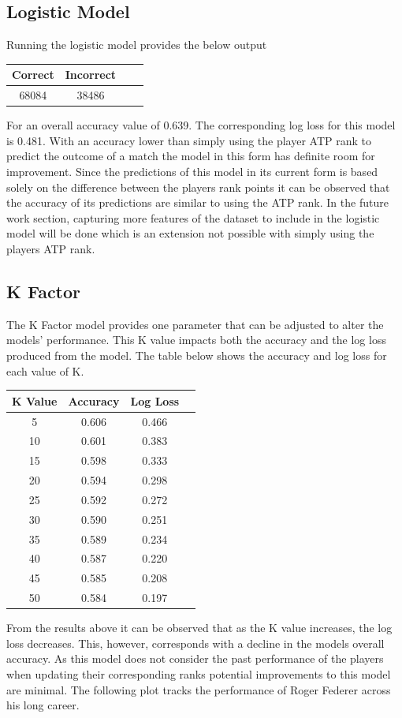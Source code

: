 \documentclass[12pt,a4paper]{article}
\begin{document}
\subsection{Logistic Model}
Running the logistic model provides the below output
\begin{center}
  \begin{tabular}{||c c c c||}
    \hline
    Correct & Incorrect \\
    \hline\hline
    68084   & 38486     \\
    \hline
  \end{tabular}
\end{center}
For an overall accuracy value of 0.639. The corresponding log loss for this model is 0.481.
With an accuracy lower than simply using the player ATP rank to predict the outcome of a
match the model in this form has definite room for improvement. Since the predictions of
this model in its current form is based solely on the difference between the players rank
points it can be observed that the accuracy of its predictions are similar to using the ATP
rank. In the future work section, capturing more features of the dataset to include in the
logistic model will be done which is an extension not possible with simply using the players
ATP rank.
\subsection{K Factor}
The K Factor model provides one parameter that can be adjusted to alter the models' performance.
This K value impacts both the accuracy and the log loss produced from the model. The table
below shows the accuracy and log loss for each value of K.

\begin{center}
  \begin{tabular}{||c c c c||}
    \hline
    K Value & Accuracy & Log Loss \\
    \hline\hline
    5       & 0.606    & 0.466    \\
    10      & 0.601    & 0.383    \\
    15      & 0.598    & 0.333    \\
    20      & 0.594    & 0.298    \\
    25      & 0.592    & 0.272    \\
    30      & 0.590    & 0.251    \\
    35      & 0.589    & 0.234    \\
    40      & 0.587    & 0.220    \\
    45      & 0.585    & 0.208    \\
    50      & 0.584    & 0.197    \\
    \hline
  \end{tabular}
\end{center}
From the results above it can be observed that as the K value increases, the log loss decreases.
This, however, corresponds with a decline in the models overall accuracy. As this model
does not consider the past performance of the players when updating their corresponding
ranks potential improvements to this model are minimal. The following plot tracks the performance
of Roger Federer across his long career.
\end{document}

